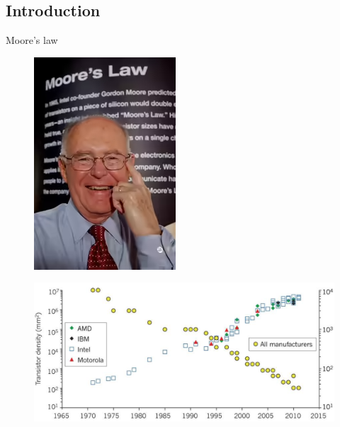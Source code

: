 \documentclass[10pt]{beamer}
\begin{document}
\begin{CJK}{UTF8}{gbsn}
\section{Introduction}
\begin{frame}[fragile]{Moore’s law}
  \begin{minipage}{0.23\textwidth}
    \begin{figure}
      \centering
      \includegraphics[width=\textwidth]{fig/moore0.png}
    \end{figure}
  \end{minipage}
  \begin{minipage}{0.75\textwidth}
    \vspace{3em}
    \begin{figure}
      \centering
      \includegraphics[width=\textwidth]{fig/moore1.png}

\end{figure}
\end{minipage}
\end{frame}
\end{CJK}
\end{document}
